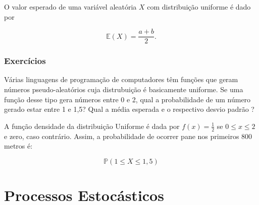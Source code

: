 \documentclass[10pt,a4paper]{article}
\begin{document}
O valor esperado de uma variável aleatória $ X $ com distribuição uniforme é dado por

\[\mathbb{E}(X) = \frac{a+b}{2}.\]

\subsubsection{Exercícios}

\begin{ex}
	Várias linguagens de programação de computadores têm funções que geram números pseudo-aleatórios cuja distrubuição é basicamente uniforme. Se uma função desse tipo gera números entre 0 e 2, qual a probabilidade de um número gerado estar entre 1 e 1,5? Qual a média esperada e o respectivo desvio padrão ?
	
	\begin{sol}
		A função densidade da distribuição Uniforme é dada por $ f(x)=\frac{1}{2} $ se  $ 0\leq x\leq 2 $ e zero, caso contrário. Assim, a probabilidade de ocorrer pane nos primeiros 800 metros é:
		
		\[\mathbb{P}(1\leq X \leq 1,5) \]
	\end{sol}
\end{ex}

\section{Processos Estocásticos}
\end{document}
